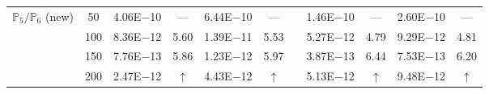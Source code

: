 \begin{table}[H]
{\begin{tabular}{@{}l c c c c c c c c c c@{}}
\midrule
\multirow{4}{*}{$\mathbb{P}_{5}/\mathbb{P}_{6}$ (new)}
 & 50 & 4.06E$-$10 & ---  & 6.44E$-$10 & --- &  & 1.46E$-$10 & --- & 2.60E$-$10 & ---\\
 & 100 & 8.36E$-$12 & 5.60  & 1.39E$-$11 & 5.53 &  & 5.27E$-$12 & 4.79 & 9.29E$-$12 & 4.81\\
 & 150 & 7.76E$-$13 & 5.86  & 1.23E$-$12 & 5.97 &  & 3.87E$-$13 & 6.44 & 7.53E$-$13 & 6.20\\
 & 200 & 2.47E$-$12 & $\uparrow$  & 4.43E$-$12 & $\uparrow$ &  & 5.13E$-$12 & $\uparrow$ & 9.48E$-$12 & $\uparrow$\\
\bottomrule
\end{tabular}}
\label{none}
\end{table}

